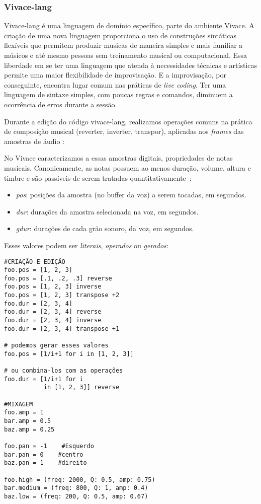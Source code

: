\documentclass
  [ams,pdfout]%
        {aesbr}
\begin{document}
\subsubsection{Vivace-lang}

Vivace-lang é uma linguagem de domínio específico, parte do ambiente
Vivace. A criação de uma nova linguagem proporciona o uso de
construções sintáticas flexíveis que permitem produzir musicas de
maneira simples e mais familiar a músicos e até mesmo pessoas sem
treinamento musical ou computacional. Essa liberdade em se ter uma
linguagem que atenda à necessidades técnicas e artísticas permite uma
maior flexibilidade de improvisação. E a improvisação, por
conseguinte, encontra lugar comum nas práticas de \emph{live
  coding}. Ter uma linguagem de sintaxe simples, com poucas regras e
comandos, diminuem a ocorrência de erros durante a sessão.

Durante a edição do código vivace-lang, realizamos operações comuns na
prática de composição musical (reverter, inverter, transpor),
aplicadas aos \emph{frames} das amostras de áudio \cite{fabbri2013}:

No Vivace caracterizamos a essas amostras digitais, propriedades de
notas musicais. Canonicamente, as notas possuem ao menos duração,
volume, altura e timbre e são passíveis de serem
tratadas quantitativamente~\cite{fabbri2013}:

\begin{itemize}
    \item \emph{pos}: posições da amostra (no buffer da voz) a serem tocadas, em segundos.
    \item \emph{dur}: durações da amostra selecionada na voz, em
      segundos.
    \item \emph{gdur}: durações de cada grão sonoro, da voz, em segundos.
\end{itemize}

Esses valores podem ser \emph{literais}, \emph{operados} ou \emph{gerados}:

\begingroup
    \fontsize{8pt}{9pt}\selectfont
\begin{verbatim}
#CRIAÇÃO E EDIÇÃO
foo.pos = [1, 2, 3]
foo.pos = [.1, .2, .3] reverse                         
foo.pos = [1, 2, 3] inverse 
foo.pos = [1, 2, 3] transpose +2  
foo.dur = [2, 3, 4]  
foo.dur = [2, 3, 4] reverse 
foo.dur = [2, 3, 4] inverse
foo.dur = [2, 3, 4] transpose +1

# podemos gerar esses valores
foo.pos = [1/i+1 for i in [1, 2, 3]]

# ou combina-los com as operações
foo.dur = [1/i+1 for i 
           in [1, 2, 3]] reverse

#MIXAGEM
foo.amp = 1                                   
bar.amp = 0.5
baz.amp = 0.25

foo.pan = -1    #Esquerdo
bar.pan = 0    #centro
baz.pan = 1    #direito

foo.high = (freq: 2000, Q: 0.5, amp: 0.75)
bar.medium = (freq: 800, Q: 1, amp: 0.4)
baz.low = (freq: 200, Q: 0.5, amp: 0.67)
\end{verbatim}
\endgroup
\end{document}

